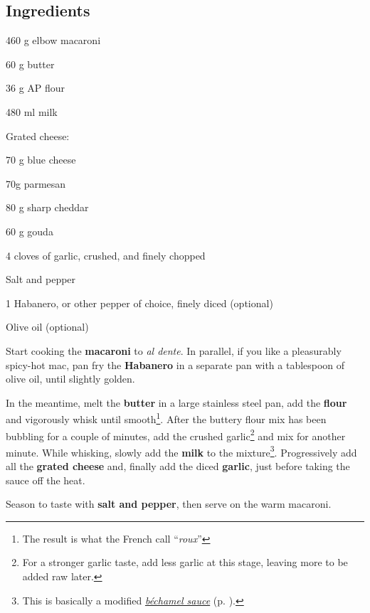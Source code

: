 \newpage
{}

\subsection*{Ingredients}
\begin{ingredients}
	\item 460 g elbow macaroni
	\item 60 g butter
	\item 36 g AP flour
	\item 480 ml milk
	\item Grated cheese: 
	\begin{ingredients}
		\item 70 g blue cheese
		\item 70g parmesan
		\item 80 g sharp cheddar
		\item 60 g gouda
	\end{ingredients}
	\item 4 cloves of garlic,  crushed, and  finely chopped
	\item Salt and pepper
	\item 1 Habanero, or other pepper of choice, finely diced (optional) 
	\item Olive oil (optional)
\end{ingredients}

\medskip

Start cooking the \textbf{macaroni} to \textit{al dente}.
In parallel, if you like a pleasurably spicy-hot mac, pan fry the \textbf{Habanero} in a separate pan with a tablespoon of olive oil, until slightly golden. 

In the meantime, melt the \textbf{butter} in a large stainless steel pan, add the \textbf{flour} and vigorously whisk until smooth\footnote{The result is what the French call ``\textit{roux}''}. 
After the buttery flour mix has been bubbling for a couple of minutes, add the crushed garlic\footnote{For a stronger garlic taste, add less garlic at this stage, leaving more to be added raw later.} and mix for another minute.
While whisking, slowly add the \textbf{milk} to the mixture\footnote{This is basically a modified \hyperref[sauce_bechamel]{\textit{béchamel sauce}} (p. \pageref{sauce_bechamel}).}.
Progressively add all the \textbf{grated cheese} and, finally add the diced \textbf{garlic}, just before taking the sauce off the heat.

Season to taste with \textbf{salt and pepper}, then serve on the warm macaroni.

\vspace*{0.75 cm}

\begin{recipeblock}
	
\end{recipeblock}